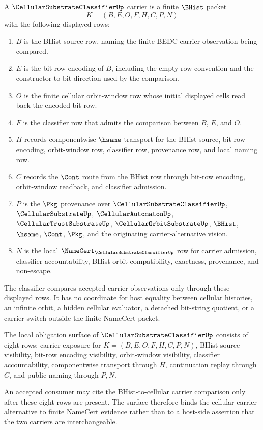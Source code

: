 \begin{definition}
\label{def:cellular-substrate-classifier-carrier}
A $\CellularSubstrateClassifierUp$ carrier is a finite $\BHist$ packet
$$
K=(B,E,O,F,H,C,P,N)
$$
with the following displayed rows:
\begin{enumerate}
\item $B$ is the BHist source row, naming the finite BEDC carrier observation being compared.
\item $E$ is the bit-row encoding of $B$, including the empty-row convention and the constructor-to-bit direction used by the comparison.
\item $O$ is the finite cellular orbit-window row whose initial displayed cells read back the encoded bit row.
\item $F$ is the classifier row that admits the comparison between $B$, $E$, and $O$.
\item $H$ records componentwise $\hsame$ transport for the BHist source, bit-row encoding, orbit-window row, classifier row, provenance row, and local naming row.
\item $C$ records the $\Cont$ route from the BHist row through bit-row encoding, orbit-window readback, and classifier admission.
\item $P$ is the $\Pkg$ provenance over $\CellularSubstrateClassifierUp$, $\CellularSubstrateUp$, $\CellularAutomatonUp$, $\CellularTrustSubstrateUp$, $\CellularOrbitSubstrateUp$, $\BHist$, $\hsame$, $\Cont$, $\Pkg$, and the originating carrier-alternative vision.
\item $N$ is the local $\NameCert_{\CellularSubstrateClassifierUp}$ row for carrier admission, classifier accountability, BHist-orbit compatibility, exactness, provenance, and non-escape.
\end{enumerate}
The classifier compares accepted carrier observations only through these displayed rows. It has no coordinate for host equality between cellular histories, an infinite orbit, a hidden cellular evaluator, a detached bit-string quotient, or a carrier switch outside the finite NameCert packet.
\end{definition}

\begin{definition}
\label{def:cellular-substrate-classifier-obligation-surface}
The local obligation surface of $\CellularSubstrateClassifierUp$ consists of eight rows: carrier exposure for $K=(B,E,O,F,H,C,P,N)$, BHist source visibility, bit-row encoding visibility, orbit-window visibility, classifier accountability, componentwise transport through $H$, continuation replay through $C$, and public naming through $P,N$.

An accepted consumer may cite the BHist-to-cellular carrier comparison only after these eight rows are present. The surface therefore binds the cellular carrier alternative to finite NameCert evidence rather than to a host-side assertion that the two carriers are interchangeable.
\end{definition}

